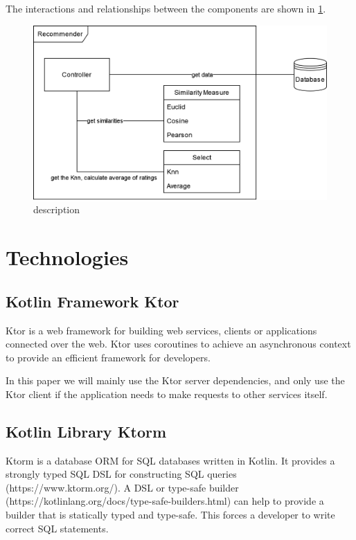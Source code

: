The interactions and relationships between the components are shown in \ref{fig:recommender_design}.

\begin{figure}[h]
\centering
\includegraphics[width=\textwidth]{images/BPM_recommender_design}
\caption{\label{fig:recommender_design}description}
\end{figure}


\section{Technologies}

\subsection{Kotlin Framework Ktor}

Ktor is a web framework for building web services, clients or applications connected over the web. Ktor uses coroutines to achieve an asynchronous context to provide an efficient framework for developers.

In this paper we will mainly use the Ktor server dependencies, and only use the Ktor client if the application needs to make requests to other services itself.

\subsection{Kotlin Library Ktorm}

Ktorm is a database ORM for SQL databases written in Kotlin. It provides a strongly typed SQL DSL for constructing SQL queries (https://www.ktorm.org/). A DSL or type-safe builder (https://kotlinlang.org/docs/type-safe-builders.html) can help to provide a builder that is statically typed and type-safe. This forces a developer to write correct SQL statements.

